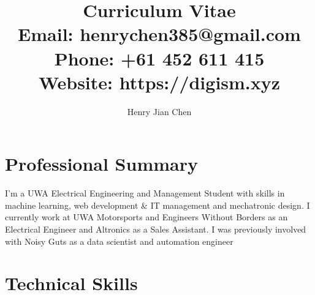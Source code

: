 \documentclass[a4page]{article}
\title{
    Curriculum Vitae \\ 
    \small{Email: henrychen385@gmail.com} \\
    \small{Phone: +61 452 611 415} \\
    \small{Website: https://digism.xyz}
}
\author{Henry Jian Chen}
\begin{document}
    \maketitle
    \section{Professional Summary}
    I’m a UWA Electrical Engineering and Management Student with skills in machine learning, web development \& IT management and mechatronic design. I currently work at UWA Motorsports and Engineers Without Borders as an Electrical Engineer and Altronics as a Sales Assistant. I was previously involved with Noisy Guts as a data scientist and automation engineer
    
    \section{Technical Skills}
\end{document}
